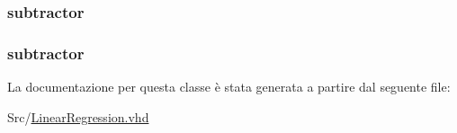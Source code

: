 \hypertarget{class_linear_regression_1_1_structural_a3fd26266a39105aca90e2b7b13923619}{
\subsubsection[{sub5}]{ {\bfseries \textcolor{vhdlchar}{subtractor}\textcolor{vhdlchar}{ }} \hspace{0.3cm}{\ttfamily [Instantiation]}}}\label{class_linear_regression_1_1_structural_a3fd26266a39105aca90e2b7b13923619}
\hypertarget{class_linear_regression_1_1_structural_aa1ef9174550e2c151dd776bd1b40a330}{
\subsubsection[{sub6}]{ {\bfseries \textcolor{vhdlchar}{subtractor}\textcolor{vhdlchar}{ }} \hspace{0.3cm}{\ttfamily [Instantiation]}}}\label{class_linear_regression_1_1_structural_aa1ef9174550e2c151dd776bd1b40a330}


La documentazione per questa classe è stata generata a partire dal seguente file\+:\begin{DoxyCompactItemize}
\item 
Src/\hyperlink{_linear_regression_8vhd}{Linear\+Regression.\+vhd}\end{DoxyCompactItemize}
